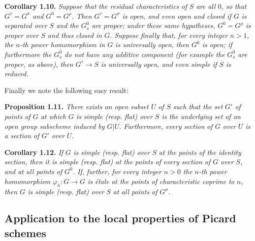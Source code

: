 \documentclass{article}
\newenvironment{itenv}[1]
  {\phantomsection\par\smallskip\noindent\textbf{#1.}\itshape}
  {\par\smallskip}
\newcommand{\oldpage}[1]{\marginpar{\footnotesize$\Big\vert$ \textit{p.~#1}}}
\theoremstyle{definition}
\theoremstyle{definition}
\theoremstyle{definition}
\theoremstyle{definition}
\theoremstyle{remark}
\begin{document}
\leavevmode{}%
\begin{itenv}{Corollary 1.10}
Suppose that the residual characteristics of \(S\) are all \(0\), so that \(G^\tau=G^\sigma\) and \(G^0=G^\rho\).
Then \(G^\tau=G^\sigma\) is open, and even open and closed if \(G\) is separated over \(S\) and the \(G_s^0\) are proper;
under these same hypotheses, \(G^0=G^\rho\) is proper over \(S\) and thus closed in \(G\).
Suppose finally that, for every integer \(n>1\), the \(n\)-th power homomorphism in \(G\) is universally open, then \(G^0\) is open;
if furthermore the \(G_s^0\) do not have any additive component (for example the \(G_s^0\) are proper, as above), then \(G^\tau\to S\) is universally open, and even simple if \(S\) is reduced.

\end{itenv}

Finally we note the following easy result:

\leavevmode{}%
\begin{itenv}{Proposition 1.11}
There exists an open subset \(U\) of \(S\) such that the set \(G'\) of points of \(G\) at which \(G\) is simple (resp. flat) over \(S\) is the underlying set of an open group subscheme induced by \(G|U\).
Furthermore, every section of \(G\) over \(U\) is a section of \(G'\) over \(U\).

\end{itenv}

\leavevmode{}%
\begin{itenv}{Corollary 1.12}
\oldpage{236-11}If \(G\) is simple (resp. flat) over \(S\) at the points of the identity section, then it is simple (resp. flat) at the points of every section of \(G\) over \(S\), and at all points of \(G^0\).
If, further, for every integer \(n>0\) the \(n\)-th power homomorphism \(\varphi_n\colon G\to G\) is étale at the points of characteristic coprime to \(n\), then \(G\) is simple (resp. flat) over \(S\) at all points of \(G^\sigma\).

\end{itenv}

\hypertarget{fga-3-vi-section-2}{%
\subsection{Application to the local properties of Picard schemes}\label{fga-3-vi-section-2}}
\end{document}
